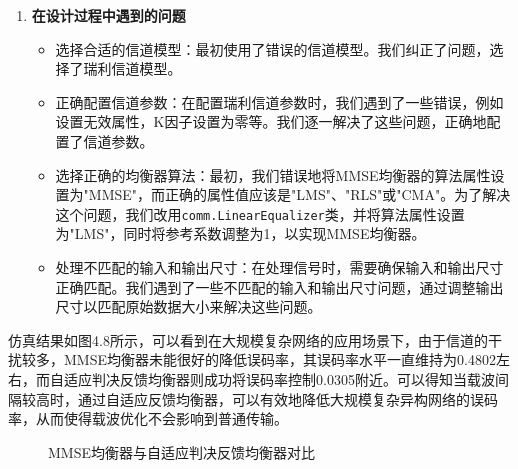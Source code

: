 \documentclass[UTF8,a4paper,12pt]{ctexart}
\numberwithin{equation}{section}
\begin{document}
\begin{enumerate}
	\item \textbf{在设计过程中遇到的问题}
	\begin{itemize}
		\item 选择合适的信道模型：最初使用了错误的信道模型。我们纠正了问题，选择了瑞利信道模型。
		\item 正确配置信道参数：在配置瑞利信道参数时，我们遇到了一些错误，例如设置无效属性，K因子设置为零等。我们逐一解决了这些问题，正确地配置了信道参数。
		\item 选择正确的均衡器算法：最初，我们错误地将MMSE均衡器的算法属性设置为"MMSE"，而正确的属性值应该是"LMS"、"RLS"或"CMA"。为了解决这个问题，我们改用\texttt{comm.LinearEqualizer}类，并将算法属性设置为"LMS"，同时将参考系数调整为1，以实现MMSE均衡器。
		\item 处理不匹配的输入和输出尺寸：在处理信号时，需要确保输入和输出尺寸正确匹配。我们遇到了一些不匹配的输入和输出尺寸问题，通过调整输出尺寸以匹配原始数据大小来解决这些问题。
	\end{itemize}
\end{enumerate}

仿真结果如图4.8所示，可以看到在大规模复杂网络的应用场景下，由于信道的干扰较多，MMSE均衡器未能很好的降低误码率，其误码率水平一直维持为0.4802左右，而自适应判决反馈均衡器则成功将误码率控制0.0305附近。可以得知当载波间隔较高时，通过自适应反馈均衡器，可以有效地降低大规模复杂异构网络的误码率，从而使得载波优化不会影响到普通传输。
\begin{figure}[H] 
	\caption{MMSE均衡器与自适应判决反馈均衡器对比}
\end{figure}
\end{document}
